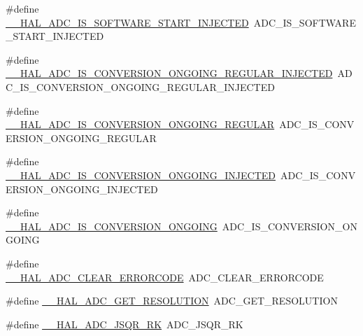 \begin{DoxyCompactItemize}
\item 
\#define \hyperlink{group___h_a_l___a_d_c___aliased___macros_ga5fa40578941f107c4ae1308e14266f7d}{\+\_\+\+\_\+\+H\+A\+L\+\_\+\+A\+D\+C\+\_\+\+I\+S\+\_\+\+S\+O\+F\+T\+W\+A\+R\+E\+\_\+\+S\+T\+A\+R\+T\+\_\+\+I\+N\+J\+E\+C\+T\+ED}~A\+D\+C\+\_\+\+I\+S\+\_\+\+S\+O\+F\+T\+W\+A\+R\+E\+\_\+\+S\+T\+A\+R\+T\+\_\+\+I\+N\+J\+E\+C\+T\+ED
\item 
\#define \hyperlink{group___h_a_l___a_d_c___aliased___macros_ga573771917c650599112d38dc260f785b}{\+\_\+\+\_\+\+H\+A\+L\+\_\+\+A\+D\+C\+\_\+\+I\+S\+\_\+\+C\+O\+N\+V\+E\+R\+S\+I\+O\+N\+\_\+\+O\+N\+G\+O\+I\+N\+G\+\_\+\+R\+E\+G\+U\+L\+A\+R\+\_\+\+I\+N\+J\+E\+C\+T\+ED}~A\+D\+C\+\_\+\+I\+S\+\_\+\+C\+O\+N\+V\+E\+R\+S\+I\+O\+N\+\_\+\+O\+N\+G\+O\+I\+N\+G\+\_\+\+R\+E\+G\+U\+L\+A\+R\+\_\+\+I\+N\+J\+E\+C\+T\+ED
\item 
\#define \hyperlink{group___h_a_l___a_d_c___aliased___macros_gaf6d1e4fb1fd1bca13b6c22953e805698}{\+\_\+\+\_\+\+H\+A\+L\+\_\+\+A\+D\+C\+\_\+\+I\+S\+\_\+\+C\+O\+N\+V\+E\+R\+S\+I\+O\+N\+\_\+\+O\+N\+G\+O\+I\+N\+G\+\_\+\+R\+E\+G\+U\+L\+AR}~A\+D\+C\+\_\+\+I\+S\+\_\+\+C\+O\+N\+V\+E\+R\+S\+I\+O\+N\+\_\+\+O\+N\+G\+O\+I\+N\+G\+\_\+\+R\+E\+G\+U\+L\+AR
\item 
\#define \hyperlink{group___h_a_l___a_d_c___aliased___macros_ga085a3824fd83a50c46bcc8edaf0f986d}{\+\_\+\+\_\+\+H\+A\+L\+\_\+\+A\+D\+C\+\_\+\+I\+S\+\_\+\+C\+O\+N\+V\+E\+R\+S\+I\+O\+N\+\_\+\+O\+N\+G\+O\+I\+N\+G\+\_\+\+I\+N\+J\+E\+C\+T\+ED}~A\+D\+C\+\_\+\+I\+S\+\_\+\+C\+O\+N\+V\+E\+R\+S\+I\+O\+N\+\_\+\+O\+N\+G\+O\+I\+N\+G\+\_\+\+I\+N\+J\+E\+C\+T\+ED
\item 
\#define \hyperlink{group___h_a_l___a_d_c___aliased___macros_ga64acf0d02a8ef5df5644c4232cef1fca}{\+\_\+\+\_\+\+H\+A\+L\+\_\+\+A\+D\+C\+\_\+\+I\+S\+\_\+\+C\+O\+N\+V\+E\+R\+S\+I\+O\+N\+\_\+\+O\+N\+G\+O\+I\+NG}~A\+D\+C\+\_\+\+I\+S\+\_\+\+C\+O\+N\+V\+E\+R\+S\+I\+O\+N\+\_\+\+O\+N\+G\+O\+I\+NG
\item 
\#define \hyperlink{group___h_a_l___a_d_c___aliased___macros_ga18c93f7ab9df4bb73371bbe50a131d6d}{\+\_\+\+\_\+\+H\+A\+L\+\_\+\+A\+D\+C\+\_\+\+C\+L\+E\+A\+R\+\_\+\+E\+R\+R\+O\+R\+C\+O\+DE}~A\+D\+C\+\_\+\+C\+L\+E\+A\+R\+\_\+\+E\+R\+R\+O\+R\+C\+O\+DE
\item 
\#define \hyperlink{group___h_a_l___a_d_c___aliased___macros_gaadc60b61ddd4d5572f3a4c6dbc0520a6}{\+\_\+\+\_\+\+H\+A\+L\+\_\+\+A\+D\+C\+\_\+\+G\+E\+T\+\_\+\+R\+E\+S\+O\+L\+U\+T\+I\+ON}~A\+D\+C\+\_\+\+G\+E\+T\+\_\+\+R\+E\+S\+O\+L\+U\+T\+I\+ON
\item 
\#define \hyperlink{group___h_a_l___a_d_c___aliased___macros_ga3f3d0f19ef64dab8816b7e4d563da42c}{\+\_\+\+\_\+\+H\+A\+L\+\_\+\+A\+D\+C\+\_\+\+J\+S\+Q\+R\+\_\+\+RK}~A\+D\+C\+\_\+\+J\+S\+Q\+R\+\_\+\+RK

\end{DoxyCompactItemize}
